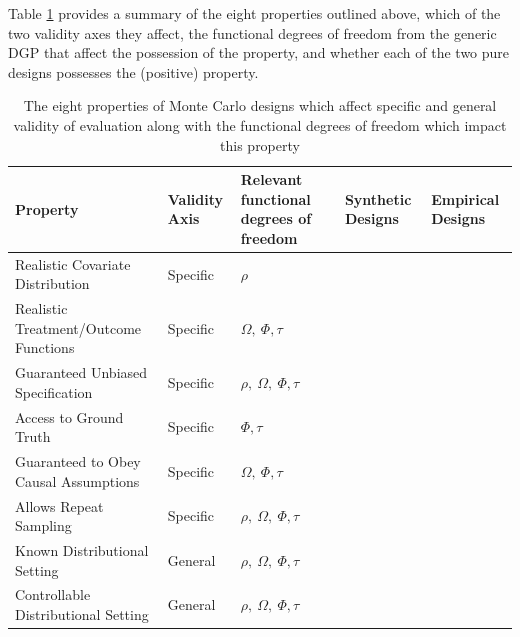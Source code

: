 \documentclass[../main.tex]{subfiles}
\begin{document}
\vspace{\baselineskip}
Table \ref{tbl:synth-vs-emp-props} provides a summary of the eight properties outlined above, which of the two validity axes they affect, the functional degrees of freedom from the generic DGP that affect the possession of the property, and whether each of the two pure designs possesses the (positive) property.\par

\begin{table}[H]
\centering
\begin{tabular}{|p{2in}|p{0.5in}|p{0.7in}|p{0.6in}|p{0.6in}|}
\hline
\textbf{Property} & \textbf{Validity Axis} & \textbf{Relevant functional degrees of freedom} & \textbf{Synthetic Designs} & \textbf{Empirical Designs} \\ \hline
Realistic Covariate Distribution      & Specific      & $\rho$                                       & \cellcolor[HTML]{F4CCCC} & \cellcolor[HTML]{D9EAD3} \\ \hline
Realistic Treatment/Outcome Functions & Specific      &   $\Omega, ~\Phi, \tau$                                      & \cellcolor[HTML]{F4CCCC} & \cellcolor[HTML]{D9EAD3} \\ \hline
Guaranteed Unbiased Specification     & Specific      &    $\rho, ~\Omega, ~\Phi, \tau$                                     & \cellcolor[HTML]{F4CCCC} & \cellcolor[HTML]{D9EAD3} \\ \hline
Access to Ground Truth                & Specific      &    $\Phi, \tau$                                     & \cellcolor[HTML]{D9EAD3} & \cellcolor[HTML]{F4CCCC} \\ \hline
Guaranteed to Obey Causal Assumptions & Specific      &    $\Omega, ~\Phi, \tau$                                     & \cellcolor[HTML]{D9EAD3} & \cellcolor[HTML]{F4CCCC} \\ \hline
Allows Repeat Sampling                & Specific      &    $\rho, ~\Omega, ~\Phi, \tau$                                     & \cellcolor[HTML]{D9EAD3} & \cellcolor[HTML]{F4CCCC} \\ \hline
Known Distributional Setting          & General       &   $\rho, ~\Omega, ~\Phi, \tau$                                      & \cellcolor[HTML]{D9EAD3} & \cellcolor[HTML]{F4CCCC} \\ \hline
Controllable Distributional Setting   & General       &   $\rho, ~\Omega, ~\Phi, \tau$                                      & \cellcolor[HTML]{D9EAD3} & \cellcolor[HTML]{F4CCCC} \\ \hline
\end{tabular}
\caption{The eight properties of Monte Carlo designs which affect specific and general validity of evaluation along with the functional degrees of freedom which impact this property}
\label{tbl:synth-vs-emp-props}
\end{table}
\end{document}
